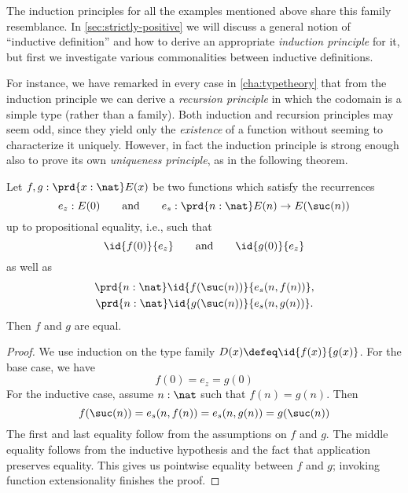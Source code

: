 The induction principles for all the examples mentioned above share this family resemblance.
In \cref{sec:strictly-positive} we will discuss a general notion of ``inductive definition'' and how to derive an appropriate \emph{induction principle} for it, but first we investigate various commonalities between inductive definitions.

%
For instance, we have remarked in every case in \cref{cha:typetheory} that from the induction principle we can derive a \emph{recursion principle} in which the codomain is a simple type (rather than a family).
Both induction and recursion principles may seem odd, since they yield only the \emph{existence} of a function without seeming to characterize it uniquely.
However, in fact the induction principle is strong enough also to prove its own \emph{uniqueness principle}, as in the following theorem.

\begin{thm}\label{thm:nat-uniq}
Let $f,g : \prd{x:\nat} E(x)$ be two functions which satisfy the recurrences
%
\begin{equation*}
  e_z : E(0)
  \qquad\text{and}\qquad
  e_s : \prd{n : \nat} E(n) \to E(\suc(n))
\end{equation*}
%
up to propositional equality, i.e., such that
\begin{equation*}
  \id{f(0)}{e_z}
  \qquad\text{and}\qquad
  \id{g(0)}{e_z}
\end{equation*}
as well as
\begin{gather*}
  \prd{n : \nat} \id{f(\suc(n))}{e_s(n, f(n))},\\
  \prd{n : \nat} \id{g(\suc(n))}{e_s(n, g(n))}.
\end{gather*}
Then $f$ and $g$ are equal.
\end{thm}

\begin{proof}
We use induction on the type family $D(x) \defeq \id{f(x)}{g(x)}$. For the base case, we have \[f(0) = e_z = g(0)\]
For the inductive case, assume $n : \nat$ such that $f(n) = g(n)$. Then
\[ f(\suc(n)) = e_s(n, f(n)) = e_s(n, g(n)) = g(\suc(n)) \]
The first and last equality follow from the assumptions on $f$ and $g$. The middle equality follows from the inductive hypothesis and the fact that application preserves equality. This gives us pointwise equality between $f$ and $g$; invoking function extensionality finishes the proof.
\end{proof}


